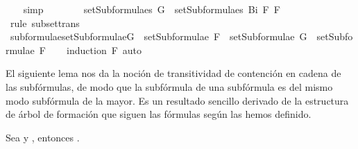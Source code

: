 \begin{isabellebody}
\ {}\ \isamarkupfalse%
\ simp\isanewline
\ \ \ \ \ \ \isamarkupfalse%
\ {\isachardoublequoteopen}setSubformulae{\isacharunderscore}s\ G\ {\isasymsubseteq}\ setSubformulae{\isacharunderscore}s\ {\isacharparenleft}Bi\ F{}\ F{}{\isacharparenright}{\isachardoublequoteclose}\ \isamarkupfalse%
\ {}{}\ {}{}\ \isamarkupfalse%
\ {\isacharparenleft}rule\ subset{\isacharunderscore}trans{\isacharparenright}\isanewline
\ \ \ \ \isamarkupfalse%
\isanewline
\ \ \isamarkupfalse%
\isanewline
{}\isamarkupfalse%
%
\endisatagproof
{\isafoldproof}%
%
\isadelimproof
\isanewline
%
\endisadelimproof
\isanewline
\isanewline
\isanewline
{}\isamarkupfalse%
\ subformulae{\isacharunderscore}setSubformulae{\isacharcolon}{\isachardoublequoteopen}G\ {\isasymin}\ setSubformulae\ F\ {\isasymLongrightarrow}\ setSubformulae\ G\ {\isasymsubseteq}\ setSubformulae\ F{\isachardoublequoteclose}\isanewline
%
\isadelimproof
\ \ %
\endisadelimproof
%
\isatagproof
{}\isamarkupfalse%
\ {\isacharparenleft}induction\ F{\isacharparenright}\ auto%
\endisatagproof
{\isafoldproof}%
%
\isadelimproof
%
\endisadelimproof
%
\begin{isamarkuptext}%
El siguiente lema nos da la noción de transitividad de contención en cadena de las subfórmulas, de modo que la
subfórmula de una subfórmula es del mismo modo subfórmula de la mayor. Es un resultado sencillo
derivado de la estructura de árbol de formación que siguen las fórmulas según las hemos definido.

\begin{lema}
    Sea  y , entonces .
  \end{lema}


\end{isamarkuptext}
\end{isabellebody}

